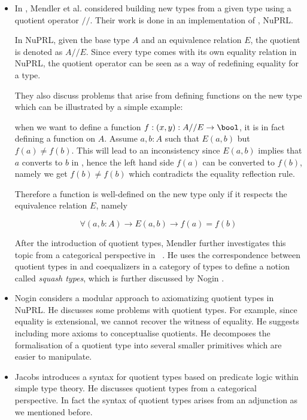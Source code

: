 \begin{itemize}

\item In \cite{cab}, Mendler et al. considered building new types from
  a given type using a quotient operator $//$. Their work is done in
  an implementation of \ett, NuPRL.

In NuPRL, given the base type $A$ and an equivalence relation $E$, the quotient is denoted as $A//E$. Since every type comes with its own equality relation in NuPRL, the quotient operator can be
seen as a way of redefining equality for a type.

They also discuss problems that arise from defining functions on the new type which can be illustrated by a simple example:

when we want to define a function $f : (x,y) : A//E \to \bool$, it is
in fact defining a function on $A$. Assume $a, b : A$ such that
$E(a,b)$ but $f(a) \not= f(b)$. This will lead to an inconsistency
since $E(a,b)$ implies that $a$ converts to $b$ in \ett, hence the
left hand side $f(a)$ can be converted to $f(b)$, namely we get $f(b)
\not= f(b)$ which contradicts the equality reflection rule.

Therefore a function is well-defined \cite{cab} on the new type only
if it respects the equivalence relation $E$, namely

$$\forall (a,b : A) \to E(a,b) \to f(a) = f(b)$$


After the introduction of quotient types, Mendler further investigates
this topic from a categorical perspective in ~\cite{men:90}. He uses
the correspondence between quotient types in \mltt{} and coequalizers
in a category of types to define a notion called \emph{squash types},
which is further discussed by Nogin \cite{nog:02}.

\item Nogin \cite{nog:02} considers a modular approach to axiomatizing
  quotient types in NuPRL. He discusses some problems with quotient
  types. For example, since equality is extensional, we cannot recover
  the witness of equality.  He suggests including more axioms to
  conceptualise quotients. He decomposes the formalisation of a
  quotient type into several smaller primitives which are easier to
  manipulate.


\item Jacobs \cite{Jacobs94quotientsin} introduces a syntax for
  quotient types based on predicate logic within simple type
  theory. He discusses quotient types from a categorical
  perspective. In fact the syntax of quotient types arises from an
  adjunction as we mentioned before.


\end{itemize}
